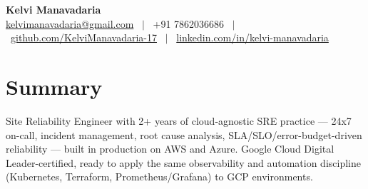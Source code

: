 \documentclass[a4paper,10.999999pt]{article}
\begin{document}
    \pagestyle{empty}



    \begin{center}
    \LARGE{\textbf{Kelvi Manavadaria}} \\[1.5pt]
    {\small
    \href{mailto:kelvimanavadaria@gmail.com}{kelvimanavadaria@gmail.com} \ $|$ \
    +91 7862036686 \ $|$ \
    \href{https://github.com/KelviManavadaria-17}{github.com/KelviManavadaria-17} \ $|$ \
    \href{https://www.linkedin.com/in/kelvi-manavadaria/}{linkedin.com/in/kelvi-manavadaria}
    }
    \end{center}

    \vspace{0.5pt}


    \section{Summary}
Site Reliability Engineer with 2+ years of cloud-agnostic SRE practice — 24x7 on-call, incident management, root cause analysis, SLA/SLO/error-budget-driven reliability — built in production on AWS and Azure. Google Cloud Digital Leader-certified, ready to apply the same observability and automation discipline (Kubernetes, Terraform, Prometheus/Grafana) to GCP environments.

\end{document}
